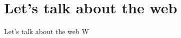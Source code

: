 \documentclass[../index.tex]{subfiles}
\begin{document}
\renewcommand{\sectiontitle}{Let's talk about the web}
\section{\sectiontitle}

\renewcommand{\currenttitle}{\sectiontitle}
\begin{frame}{\currenttitle}
  W

\end{frame}


\end{document}
